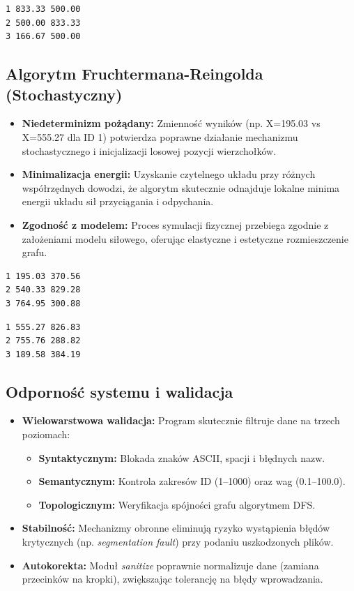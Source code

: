 \documentclass[12pt,a4paper]{article}
\begin{document}
\begin{lstlisting}[language={}, caption={Wynik algorytmu Tutte'a (zawsze powtarzalny)}]
1 833.33 500.00
2 500.00 833.33
3 166.67 500.00
\end{lstlisting}

\subsection{Algorytm Fruchtermana-Reingolda (Stochastyczny)}
\begin{itemize}
    \item \textbf{Niedeterminizm pożądany:} Zmienność wyników (np. X=195.03 vs X=555.27 dla ID 1) potwierdza poprawne działanie mechanizmu stochastycznego i inicjalizacji losowej pozycji wierzchołków.
    \item \textbf{Minimalizacja energii:} Uzyskanie czytelnego układu przy różnych współrzędnych dowodzi, że algorytm skutecznie odnajduje lokalne minima energii układu sił przyciągania i odpychania.
    \item \textbf{Zgodność z modelem:} Proces symulacji fizycznej przebiega zgodnie z założeniami modelu siłowego, oferując elastyczne i estetyczne rozmieszczenie grafu.
\end{itemize}

\begin{lstlisting}[language={}, caption={Wynik Fruchtermana - Proba 1}]
1 195.03 370.56
2 540.33 829.28
3 764.95 300.88
\end{lstlisting}

\begin{lstlisting}[language={}, caption={Wynik Fruchtermana - Proba 2}]
1 555.27 826.83
2 755.76 288.82
3 189.58 384.19
\end{lstlisting}




\subsection{Odporność systemu i walidacja}
\begin{itemize}
    \item \textbf{Wielowarstwowa walidacja:} Program skutecznie filtruje dane na trzech poziomach:
        \begin{itemize}
            \item \textbf{Syntaktycznym:} Blokada znaków ASCII, spacji i błędnych nazw.
            \item \textbf{Semantycznym:} Kontrola zakresów ID (1--1000) oraz wag (0.1--100.0).
            \item \textbf{Topologicznym:} Weryfikacja spójności grafu algorytmem DFS.
        \end{itemize}
    \item \textbf{Stabilność:} Mechanizmy obronne eliminują ryzyko wystąpienia błędów krytycznych (np. \textit{segmentation fault}) przy podaniu uszkodzonych plików.
    \item \textbf{Autokorekta:} Moduł \textit{sanitize} poprawnie normalizuje dane (zamiana przecinków na kropki), zwiększając tolerancję na błędy wprowadzania.
\end{itemize}
\end{document}
